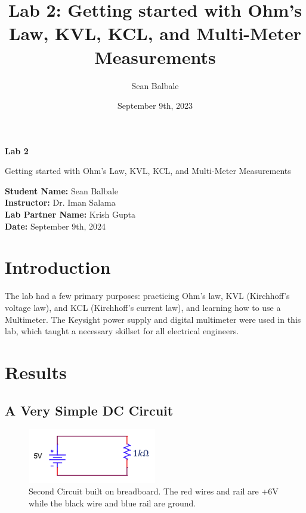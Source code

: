 \documentclass{article}
\title{Lab 2: Getting started with Ohm's Law, KVL, KCL, and Multi-Meter
Measurements}
\author{Sean Balbale}
\date{September 9th, 2023}
\begin{document}
\begin{titlepage}
    \begin{center}
        \vspace*{1in}
            
        \Huge
        \textbf{Lab 2}
            
        \LARGE
        Getting started with Ohm’s Law, KVL, KCL, and Multi-Meter Measurements
            
        \vspace{3 in}
            
        \textbf{Student Name:} Sean Balbale
        \\ \textbf{Instructor:} Dr. Iman Salama
        \\ \textbf{Lab Partner Name:} Krish Gupta
        \\ \textbf{Date:} September 9th, 2024

        \vfill
            
            
    \end{center}
\end{titlepage}

\newpage 


\section{Introduction}
The lab had a few primary purposes: practicing Ohm’s law, 
KVL (Kirchhoff's voltage law), and KCL (Kirchhoff's current law), 
and learning how to use a Multimeter. The Keysight power supply 
and digital multimeter were used in this lab, which taught a 
necessary skillset for all electrical engineers.

\section{Results}


\subsection{A Very Simple DC Circuit}
\begin{figure}[H]
    \centering
    \includegraphics[width=0.5\textwidth]{simple_resistor_circuit_for_part1.png}
    \caption{Second Circuit built on breadboard. The red wires and rail are +6V while the black wire and blue rail are ground.}
    \label{fig:fig1}
\end{figure}
\end{document}
